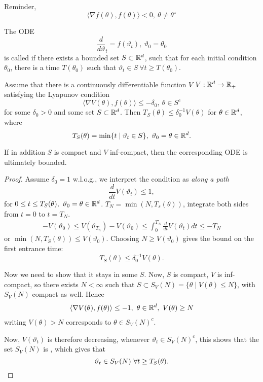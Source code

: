 Reminder, 
\[\langle \nabla f(\theta),f(\theta)\rangle < 0,\ \theta\neq \theta^\star\]

\begin{definition}\label{def:41}
    The ODE \[\frac{d}{d\vartheta}_t=f(\vartheta_t),\ \vartheta_0=\theta_0\] is called 
     if there exists a bounded set \(S\subset \mathbb{R}^d\), such that 
    for each initial condition \(\theta_0\), there is a time \(T(\theta_0)\) such that 
    \(\vartheta_t\in S \ \forall t\geq T(\theta_0)\).
\end{definition}

\begin{proposition}\label{prop:42}
    Assume that there is a continuously differentiable function \(V\)
    \(V:\mathbb{R}^d\to \mathbb{R}_+\) satisfying the Lyapunov condition
    \[\langle \nabla V(\theta),f(\theta)\rangle\leq -\delta_0,\ \theta\in S^c\]
    for some \(\delta_0>0\) and some set \(S\subset \mathbb{R}^d\). Then \(T_S(\theta)\leq \delta_0^{-1}V(\theta)\)
    for \(\theta\in\mathbb{R}^d\), where 
    \[T_S(\theta)=\min \{t\mid \vartheta_t\in S\},\ \vartheta_0=\theta\in \R^d.\]
    
    If in addition \(S\) is compact and \(V\) inf-compact, then the corresponding ODE is ultimately bounded. 
\end{proposition}

\begin{proof}
    Assume \(\delta_0=1\) w.l.o.g., we interpret the condition as \textit{along a path}
    \[\frac{d}{dt}V(\vartheta_t)\leq 1,\]
    for \(0\leq t\leq T_S(\theta),\ \vartheta_0=\theta\in \R^d\).
    \(T_N=\min(N,T_s(\theta))\), integrate both sides from \(t=0\) to \(t=T_N\).
    \begin{align*}
        -V(\vartheta_0)\leq V(\vartheta_{T_n})-V(\vartheta_0)\leq \int_0^{T_N} \frac{d}{dt}V(\vartheta_t)dt\leq -T_N
    \end{align*}
    or \(\min(N,T_S(\theta))\leq V(\vartheta_0)\). Choosing \(N\geq V(\vartheta_0)\) gives 
    the bound on the first entrance time:
    \[T_S(\theta)\leq \delta_0^{-1}V(\theta).\]
    
    Now we need to show that it stays in some \(S\). Now, \(S\) is compact, \(V\)
    is inf-compact, so there exists \(N<\infty\) such that \(S\subset S_V(N)=\{\theta\mid V(\theta)\leq N\}\),
    with \(S_V(N)\) compact as well. Hence  
    \begin{align*}
        \langle \nabla V(\theta),f(\theta)\rangle \leq -1, \ \theta\in \mathbb{R}^d,\ V(\theta)\geq N
    \end{align*}
    writing \(V(\theta)>N\) corresponds to \(\theta\in S_V(N)^c\). 
    
    Now, \(V(\vartheta_t)\) is therefore decreasing, whenever \(\vartheta_t\in S_V(N)^c\), this shows 
    that the set \(S_V(N)\) is , which gives that \[\vartheta_t\in S_V(N)\ \forall t\geq T_S(\theta).\qedhere\]
\end{proof}

